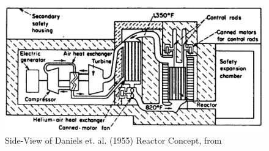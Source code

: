 \begin{figure}[h!]
\centering
\includegraphics[width=0.6\linewidth]{figures/daniels-1}
\caption{Side-View of Daniels et. al. (1955) Reactor Concept, from \cite{simnad_early_1991}}
\label{fig:daniels-1}
\end{figure}